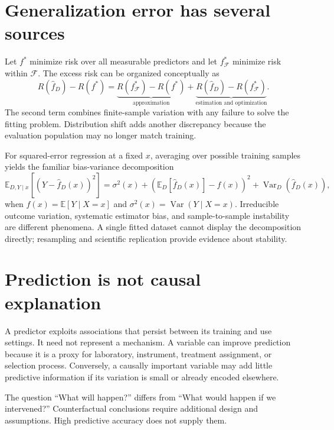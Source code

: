 \section{Generalization error has several sources}

Let $f^*$ minimize risk over all measurable predictors and let
$f^*_{\mathcal{F}}$ minimize risk within $\mathcal{F}$. The excess risk can be
organized conceptually as
\[
R(\widehat f_D)-R(f^*)
=\underbrace{R(f^*_{\mathcal{F}})-R(f^*)}_{\text{approximation}}
+\underbrace{R(\widehat f_D)-R(f^*_{\mathcal{F}})}_{\text{estimation and optimization}}.
\]
The second term combines finite-sample variation with any failure to solve the
fitting problem. Distribution shift adds another discrepancy because the
evaluation population may no longer match training.

For squared-error regression at a fixed $x$, averaging over possible training
samples yields the familiar bias-variance decomposition
\[
\mathbb{E}_{D,Y\mid x}[(Y-\widehat f_D(x))^2]
=\sigma^2(x)
+\left(\mathbb{E}_D[\widehat f_D(x)]-f(x)\right)^2
+\operatorname{Var}_D(\widehat f_D(x)),
\]
when $f(x)=\mathbb{E}[Y\mid X=x]$ and
$\sigma^2(x)=\operatorname{Var}(Y\mid X=x)$. Irreducible outcome variation,
systematic estimator bias, and sample-to-sample instability are different
phenomena. A single fitted dataset cannot display the decomposition directly;
resampling and scientific replication provide evidence about stability.


\section{Prediction is not causal explanation}

A predictor exploits associations that persist between its training and use
settings. It need not represent a mechanism. A variable can improve prediction
because it is a proxy for laboratory, instrument, treatment assignment, or
selection process. Conversely, a causally important variable may add little
predictive information if its variation is small or already encoded elsewhere.

The question ``What will happen?'' differs from ``What would happen if we
intervened?'' Counterfactual conclusions require additional design and
assumptions. High predictive accuracy does not supply them.

